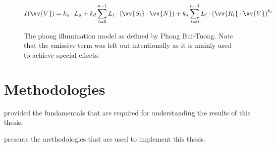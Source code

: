 \documentclass[%
    a4paper,    %
    justified,  %
    nobib,      %
    openany     %
]{tufte-book}
\begin{document}
\begin{figure}
  \label{eq:phong-equation}
  \caption{The phong illumination model as defined by Phong Bui-Tuong. Note that
  the emissive term was left out intentionally as it is mainly used to achieve
  special effects.}
  \begin{equation}
    I(\vv{V}) = k_{a} \cdot L_{a} + k_{d} \displaystyle\sum_{i=0}^{n - 1} L_{i} \cdot (\vv{S_{i}} \cdot \vv{N}) + k_{s} \displaystyle\sum_{i=0}^{n - 1} L_{i} \cdot {(\vv{R_{i}} \cdot \vv{V})}^{k_{e}}
  \end{equation}
\end{figure}

\chapter{Methodologies}
\label{chap:methodologies}


 provided the fundamentals that are required for
understanding the results of this thesis.

 presents the methodologies that are used to implement
this thesis.
\end{document}
